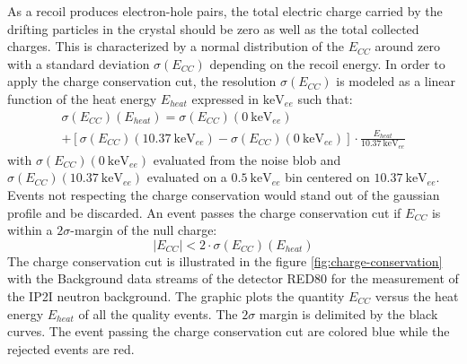 As a recoil produces electron-hole pairs, the total electric charge carried by the drifting particles in the crystal should be zero as well as the total collected charges. This is characterized by a normal distribution of the $E_{CC}$ around zero with a standard deviation $\sigma(E_{CC})$ depending on the recoil energy. In order to apply the charge conservation cut, the resolution $\sigma(E_{CC})$ is modeled as a linear function of the heat energy $E_{heat}$ expressed in $\si{\kilo\eV_{ee}}$ such that:
\begin{multline}
\label{eq:charge-conservation-resolution}
\sigma(E_{CC})(E_{heat})
=
\sigma(E_{CC})(\SI{0}{\kilo\eV_{ee}}) \\ + \left[ \sigma(E_{CC})(\SI{10.37}{\kilo\eV_{ee}}) - \sigma(E_{CC})(\SI{0}{\kilo\eV_{ee}}) \right]\cdot \frac{E_{heat}}{\SI{10.37}{\kilo\eV_{ee}}}
\end{multline}
with $\sigma(E_{CC})(\SI{0}{\kilo\eV_{ee}})$ evaluated from the noise blob and $\sigma(E_{CC})(\SI{10.37}{\kilo\eV_{ee}})$ evaluated on a $\SI{0.5}{\kilo\eV_{ee}}$ bin centered on $\SI{10.37}{\kilo\eV_{ee}}$.
Events not respecting the charge conservation would stand out of the gaussian profile and be discarded. An event passes the charge conservation cut if $E_{CC}$ is within a $2\sigma$-margin of the null charge:
\begin{equation}
\label{eq:charge-conservation-cut}
|E_{CC}| < 2 \cdot \sigma(E_{CC})(E_{heat})
\end{equation}
The charge conservation cut is illustrated in the figure \ref{fig:charge-conservation} with the Background data streams of the detector RED80 for the measurement of the IP2I neutron background. The graphic plots the quantity $E_{CC}$ versus the heat energy $E_{heat}$ of all the quality events. The $2\sigma$ margin is delimited by the black curves. The event passing the charge conservation cut are colored blue while the rejected events are red.


